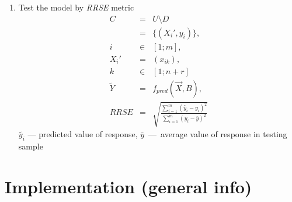 \documentclass{beamer}
\newcounter{saveenumi}
\newcommand{\seti}{\setcounter{saveenumi}{\value{enumi}}}
\newcommand{\conti}{\setcounter{enumi}{\value{saveenumi}}}
\begin{document}
\begin{frame}
	\begin{enumerate}
		\conti
		\item Test the model by \textit{RRSE} metric
			\begin{eqnarray}
				C &=& U \setminus D \\
				  &=& \{ (X_i', y_i) \}, \\
				i &\in & [1;m], \\
				X_i' &=& (x_{ik}), \\
				k &\in & [1;n+r] \\
				\tilde{Y} &=& f_{pred} (\vec{X}, B), \\
				RRSE &=& \sqrt{ \frac{ \sum\limits_{i=1}^m { ( \tilde{y_i}-y_i )^2 } }
				                     { \sum\limits_{i=1}^m { ( y_i - \bar{y} )^2 } } }
			\end{eqnarray}
		$\tilde{y_i}$ --- predicted value of response, $\bar{y}$~---~average value of response in testing sample
		\seti
	\end{enumerate}
\end{frame}

\section{Implementation (general info)}
\end{document}
